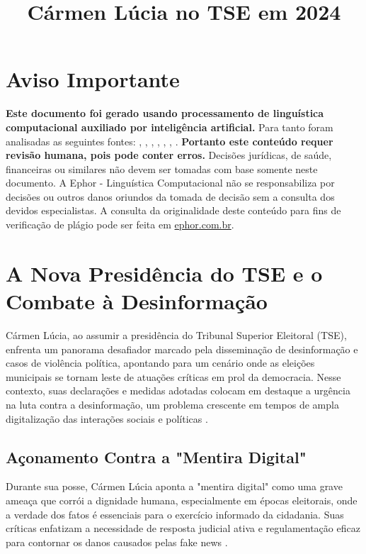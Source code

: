 \documentclass[
   article,       
   12pt,          
   oneside,       
   a4paper,       
   english,       
   brazil,        
   sumario=tradicional
   ]{abntex2}
\begin{document}
\frenchspacing 
\maketitle

\textual
\section{Aviso Importante}
\textbf{Este documento foi gerado usando processamento de linguística computacional auxiliado por inteligência artificial.} Para tanto foram analisadas as seguintes fontes:  \cite{As_duas_preocupacoes_que_rondam_Carmen_Lucia_}, \cite{Carmen_Lucia_tem_de_afastar_TSE_da_polarizaca}, \cite{Carmen_Lucia_toma_posse_na_presidencia_do_TSE}, \cite{Contra_o_virus_da_mentira_ha_o_remedio_da_inf}, \cite{Mendonca_e_o_unico_ministro_do_STF_a_faltar_a}, \cite{Pacheco_participa_da_posse_na_Carmen_Lucia_na}, \cite{Quem_centraliza_poderes_em_uma_pessoa_chamase}.
\textbf{Portanto este conteúdo requer revisão humana, pois pode conter erros.} Decisões jurídicas, de saúde, financeiras ou similares não devem ser tomadas com base somente neste documento. A Ephor - Linguística Computacional não se responsabiliza por decisões ou outros danos oriundos da tomada de decisão sem a consulta dos devidos especialistas.
A consulta da originalidade deste conteúdo para fins de verificação de plágio pode ser feita em \href{http://www.ephor.com.br}{ephor.com.br}.
\title{Cármen Lúcia no TSE em 2024}

\section{A Nova Presidência do TSE e o Combate à Desinformação}
Cármen Lúcia, ao assumir a presidência do Tribunal Superior Eleitoral (TSE), enfrenta um panorama desafiador marcado pela disseminação de desinformação e casos de violência política, apontando para um cenário onde as eleições municipais se tornam leste de atuações críticas em prol da democracia. Nesse contexto, suas declarações e medidas adotadas colocam em destaque a urgência na luta contra a desinformação, um problema crescente em tempos de ampla digitalização das interações sociais e políticas \cite{Carmen_Lucia_toma_posse_na_presidencia_do_TSE}.

\subsection{Açonamento Contra a "Mentira Digital"}
Durante sua posse, Cármen Lúcia aponta a "mentira digital" como uma grave ameaça que corrói a dignidade humana, especialmente em épocas eleitorais, onde a verdade dos fatos é essenciais para o exercício informado da cidadania. Suas críticas enfatizam a necessidade de resposta judicial ativa e regulamentação eficaz para contornar os danos causados pelas fake news \cite{Contra_o_virus_da_mentira_ha_o_remedio_da_inf}.
\end{document}
